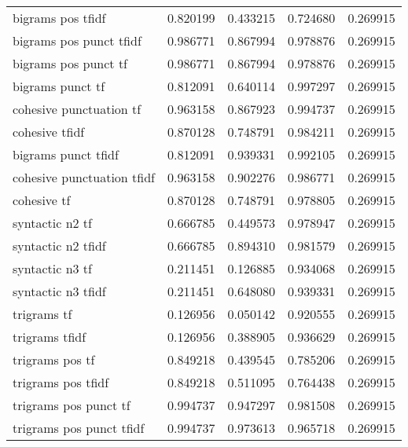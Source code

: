 \documentclass{article}
\begin{document}
\begin{table}
\begin{tabular}{lrrrr}
bigrams pos tfidf          &  0.820199 &     0.433215 &       0.724680 &             0.269915 \\
bigrams pos punct tfidf    &  0.986771 &     0.867994 &       0.978876 &             0.269915 \\
bigrams pos punct tf       &  0.986771 &     0.867994 &       0.978876 &             0.269915 \\
bigrams punct tf           &  0.812091 &     0.640114 &       0.997297 &             0.269915 \\
cohesive punctuation tf    &  0.963158 &     0.867923 &       0.994737 &             0.269915 \\
cohesive tfidf             &  0.870128 &     0.748791 &       0.984211 &             0.269915 \\
bigrams punct tfidf        &  0.812091 &     0.939331 &       0.992105 &             0.269915 \\
cohesive punctuation tfidf &  0.963158 &     0.902276 &       0.986771 &             0.269915 \\
cohesive tf                &  0.870128 &     0.748791 &       0.978805 &             0.269915 \\
syntactic n2 tf            &  0.666785 &     0.449573 &       0.978947 &             0.269915 \\
syntactic n2 tfidf         &  0.666785 &     0.894310 &       0.981579 &             0.269915 \\
syntactic n3 tf            &  0.211451 &     0.126885 &       0.934068 &             0.269915 \\
syntactic n3 tfidf         &  0.211451 &     0.648080 &       0.939331 &             0.269915 \\
trigrams tf                &  0.126956 &     0.050142 &       0.920555 &             0.269915 \\
trigrams tfidf             &  0.126956 &     0.388905 &       0.936629 &             0.269915 \\
trigrams pos tf            &  0.849218 &     0.439545 &       0.785206 &             0.269915 \\
trigrams pos tfidf         &  0.849218 &     0.511095 &       0.764438 &             0.269915 \\
trigrams pos punct tf      &  0.994737 &     0.947297 &       0.981508 &             0.269915 \\
trigrams pos punct tfidf   &  0.994737 &     0.973613 &       0.965718 &             0.269915 \\

\end{tabular}
\end{table}
\end{document}
